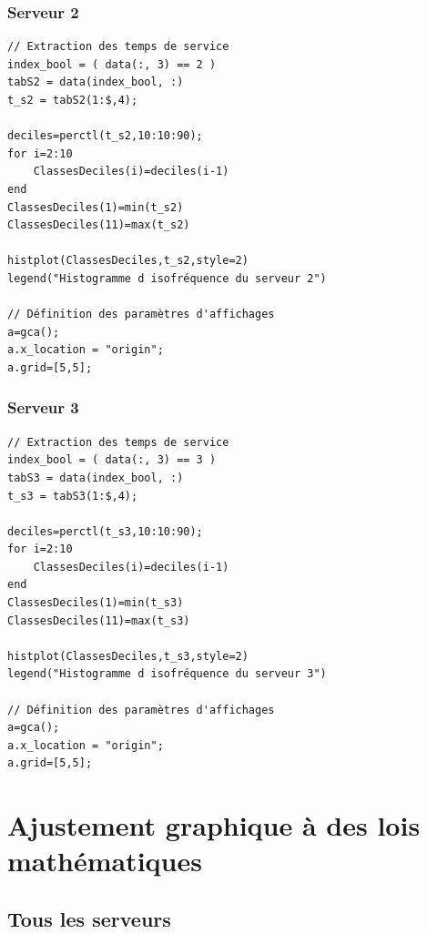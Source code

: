 \documentclass{article}
\begin{document}
\subsubsection{Serveur 2}
\begin{verbatim}
// Extraction des temps de service
index_bool = ( data(:, 3) == 2 )
tabS2 = data(index_bool, :)
t_s2 = tabS2(1:$,4);

deciles=perctl(t_s2,10:10:90);
for i=2:10
    ClassesDeciles(i)=deciles(i-1)
end
ClassesDeciles(1)=min(t_s2)
ClassesDeciles(11)=max(t_s2)

histplot(ClassesDeciles,t_s2,style=2)
legend("Histogramme d isofréquence du serveur 2")

// Définition des paramètres d'affichages
a=gca();
a.x_location = "origin";
a.grid=[5,5];
\end{verbatim}

\subsubsection{Serveur 3}
\begin{verbatim}
// Extraction des temps de service
index_bool = ( data(:, 3) == 3 )
tabS3 = data(index_bool, :)
t_s3 = tabS3(1:$,4);

deciles=perctl(t_s3,10:10:90);
for i=2:10
    ClassesDeciles(i)=deciles(i-1)
end
ClassesDeciles(1)=min(t_s3)
ClassesDeciles(11)=max(t_s3)

histplot(ClassesDeciles,t_s3,style=2)
legend("Histogramme d isofréquence du serveur 3")

// Définition des paramètres d'affichages
a=gca();
a.x_location = "origin";
a.grid=[5,5];
\end{verbatim}

\section{Ajustement graphique à des lois mathématiques}

\subsection{Tous les serveurs}
\end{document}
